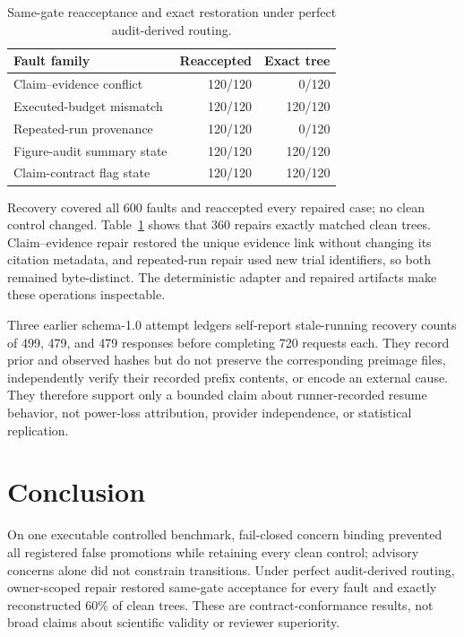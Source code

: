 \documentclass[11pt]{article}
\begin{document}
\begin{table}[!t]
\centering
\small
\begin{tabular}{lrr}
\toprule
Fault family & Reaccepted & Exact tree \\
\midrule
Claim--evidence conflict & 120/120 & 0/120 \\
Executed-budget mismatch & 120/120 & 120/120 \\
Repeated-run provenance & 120/120 & 0/120 \\
Figure-audit summary state & 120/120 & 120/120 \\
Claim-contract flag state & 120/120 & 120/120 \\
\bottomrule
\end{tabular}
\caption{Same-gate reacceptance and exact restoration under perfect
audit-derived routing.}
\label{tab:recovery}
\end{table}

Recovery covered all 600 faults and reaccepted every repaired case; no clean
control changed. Table~\ref{tab:recovery} shows that 360 repairs exactly matched
clean trees. Claim--evidence repair restored the unique evidence link without
changing its citation metadata, and repeated-run repair used new trial
identifiers, so both remained byte-distinct. The deterministic adapter and
repaired artifacts make these operations inspectable.

Three earlier schema-1.0 attempt ledgers self-report stale-running recovery
counts of 499, 479, and 479 responses before completing 720 requests each.
They record prior and observed hashes but do not preserve the corresponding
preimage files, independently verify their recorded prefix contents, or encode an
external cause. They therefore support only a bounded claim about
runner-recorded resume behavior, not power-loss attribution, provider
independence, or statistical replication.

\section{Conclusion}

On one executable controlled benchmark, fail-closed concern binding prevented
all registered false promotions while retaining every clean control; advisory
concerns alone did not constrain transitions. Under perfect audit-derived
routing, owner-scoped repair restored same-gate acceptance for every fault and
exactly reconstructed 60\% of clean trees. These are contract-conformance
results, not broad claims about scientific validity or reviewer superiority.
\end{document}
